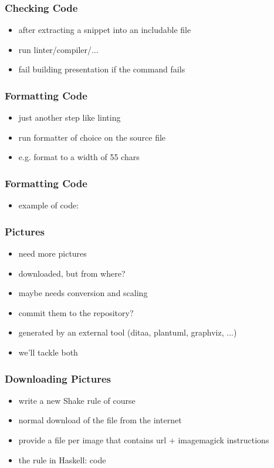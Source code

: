 \documentclass{beamer}
\begin{document}
\begin{frame}
  \frametitle{Checking Code}
  \begin{itemize}
  \item after extracting a snippet into an includable file
  \item run linter/compiler/...
  \item fail building presentation if the command fails
  \end{itemize}
\end{frame}

\begin{frame}
  \frametitle{Formatting Code}
  \begin{itemize}
  \item just another step like linting
  \item run formatter of choice on the source file
  \item e.g. format to a width of 55 chars
  \end{itemize}
\end{frame}

\begin{frame}
  \frametitle{Formatting Code}
  \begin{itemize}
  \item example of code:
  \end{itemize}
\end{frame}

\begin{frame}
  \frametitle{Pictures}
  \begin{itemize}
  \item need more pictures
  \item downloaded, but from where?
  \item maybe needs conversion and scaling
  \item commit them to the repository?
  \item generated by an external tool (ditaa, plantuml, graphviz, ...)
  \item we'll tackle both
  \end{itemize}
\end{frame}

\begin{frame}
  \frametitle{Downloading Pictures}
  \begin{itemize}
  \item write a new Shake rule of course
  \item normal download of the file from the internet
  \item provide a file per image that contains url + imagemagick instructions
  \item the rule in Haskell: code
  \end{itemize}
\end{frame}
\end{document}
